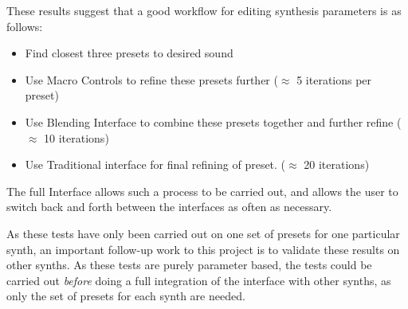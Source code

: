 \documentclass[11pt, oneside]{report}   	%
\begin{document}
These results suggest that a good workflow for editing synthesis parameters is as follows:
\vspace{-3em}
\begin{itemize}
	\setlength\itemsep{-1.2em}
	\item Find closest three presets to desired sound
	\item Use Macro Controls to refine these presets further ($\approx$ 5 iterations per preset)
	\item Use Blending Interface to combine these presets together and further refine ($\approx$ 10 iterations)
	\item Use Traditional interface for final refining of preset. ($\approx$ 20 iterations)
\end{itemize}
\vspace{-10pt}
The full Interface allows such a process to be carried out, and allows the user to switch back and forth between the interfaces as often as necessary.

As these tests have only been carried out on one set of presets for one particular synth, an important follow-up work to this project is to validate these results on other synths. As these tests are purely parameter based, the tests could be carried out \emph{before} doing a full integration of the interface with other synths, as only the set of presets for each synth are needed.
\end{document}
